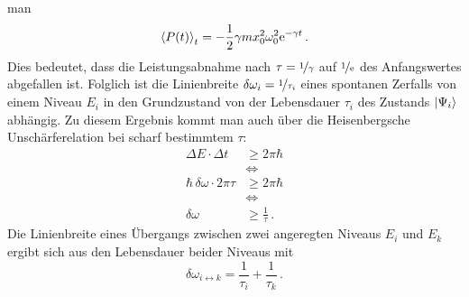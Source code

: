man
\begin{equation}\label{eq:klassischer_oszillator_leistung_02}
	\left\langle P(t)\right\rangle_t=-\frac{1}{2}\gamma mx_0^2\omega_0^2\mathrm{e}^{-\gamma
	t}\,.
\end{equation}
Dies bedeutet, dass die Leistungsabnahme nach $\tau=\nicefrac{1}{\gamma}$ auf
$\nicefrac{1}{\mathrm{e}}$ des Anfangswertes abgefallen ist. Folglich ist die
Linienbreite $\delta\omega_i=\nicefrac{1}{\tau_i}$ eines spontanen Zerfalls von
einem Niveau $E_i$ in den Grundzustand von der Lebensdauer $\tau_i$ des
Zustands $|{\Psi_i}\rangle$ abhängig.
Zu diesem Ergebnis kommt man auch über die Heisenbergsche Unschärferelation bei scharf bestimmtem $\tau$:
\begin{equation}\label{eq:unschaerferelation}
	\begin{split}
		\Delta E\cdot\Delta t &\geq2\pi\hbar\\
		&\Leftrightarrow\\
		\hbar\,\delta\omega\cdot2\pi\tau &\geq2\pi\hbar\\
		&\Leftrightarrow\\
		\delta\omega &\geq\frac{1}{\tau}\,.
	\end{split}
\end{equation}
Die Linienbreite eines Übergangs zwischen
zwei angeregten Niveaus $E_i$ und $E_k$ ergibt sich aus den Lebensdauer beider Niveaus mit
\begin{equation}\label{eq:natuerliche_linienbreite_lebensdauern}
	\delta\omega_{i\leftrightarrow
	k}=\frac{1}{\tau_i}+\frac{1}{\tau_k}\,.
\end{equation}

